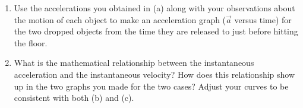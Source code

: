 \begin{benumerate}
\begin{enumerate}
		\item Use the accelerations you obtained in (a) along with your observations about the motion of each object to make an acceleration graph ($\vec{a}$ versus time) for the two dropped objects from the time they are released to just before hitting the floor.
		
		\item What is the mathematical relationship between the instantaneous acceleration and the instantaneous velocity? How does this relationship show up in the two graphs you made for the two cases? Adjust your curves to be consistent with both (b) and (c).
	\end{enumerate}
\end{benumerate}

\WCD
